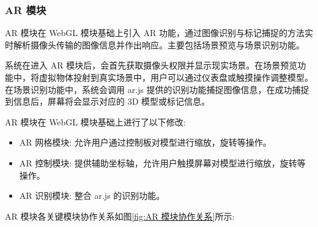 \subsubsection{AR 模块}

AR 模块在 WebGL 模块基础上引入 AR 功能，通过图像识别与标记捕捉的方法实时解析摄像头传输的图像信息并作出响应。主要包括场景预览与场景识别功能。

系统在进入 AR 模块后，会首先获取摄像头权限并显示现实场景。在场景预览功能中，将虚拟物体投射到真实场景中，用户可以通过仪表盘或触摸操作调整模型。在场景识别功能中，系统会调用 ar.js 提供的识别功能捕捉图像信息，在成功捕捉到信息后，屏幕将会显示对应的 3D 模型或标记信息。

AR 模块在 WebGL 模块基础上进行了以下修改:
\begin{itemize}
  \item AR 网格模块: 允许用户通过控制板对模型进行缩放，旋转等操作。
  \item AR 控制模块: 提供辅助坐标轴，允许用户触摸屏幕对模型进行缩放，旋转等操作。
  \item AR 识别模块: 整合 ar.js 的识别功能。
\end{itemize}

AR 模块各关键模块协作关系如图\ref{fig:AR 模块协作关系}所示:

